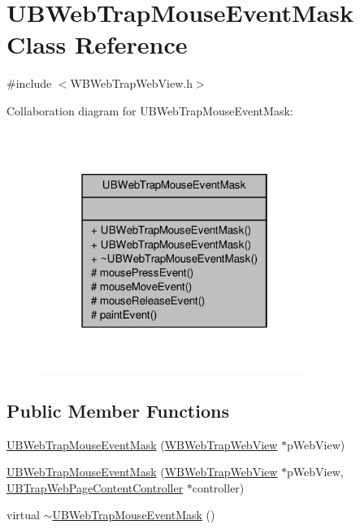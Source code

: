 \hypertarget{class_u_b_web_trap_mouse_event_mask}{\section{U\-B\-Web\-Trap\-Mouse\-Event\-Mask Class Reference}
\label{dd/df0/class_u_b_web_trap_mouse_event_mask}
}


{\ttfamily \#include $<$W\-B\-Web\-Trap\-Web\-View.\-h$>$}



Collaboration diagram for U\-B\-Web\-Trap\-Mouse\-Event\-Mask\-:
\nopagebreak
\begin{figure}[H]
\begin{center}
\leavevmode
\includegraphics[width=250pt]{d2/d54/class_u_b_web_trap_mouse_event_mask__coll__graph}
\end{center}
\end{figure}
\subsection*{Public Member Functions}
\begin{DoxyCompactItemize}
\item 
\hyperlink{class_u_b_web_trap_mouse_event_mask_ac9119adb597aa36e77fec485f994cd16}{U\-B\-Web\-Trap\-Mouse\-Event\-Mask} (\hyperlink{class_w_b_web_trap_web_view}{W\-B\-Web\-Trap\-Web\-View} $\ast$p\-Web\-View)
\item 
\hyperlink{class_u_b_web_trap_mouse_event_mask_a94c4a233a5339731cb884c0cc948d44a}{U\-B\-Web\-Trap\-Mouse\-Event\-Mask} (\hyperlink{class_w_b_web_trap_web_view}{W\-B\-Web\-Trap\-Web\-View} $\ast$p\-Web\-View, \hyperlink{class_u_b_trap_web_page_content_controller}{U\-B\-Trap\-Web\-Page\-Content\-Controller} $\ast$controller)
\item 
virtual \hyperlink{class_u_b_web_trap_mouse_event_mask_a78a8cc6d17b7017a1a1fb68953da08dc}{$\sim$\-U\-B\-Web\-Trap\-Mouse\-Event\-Mask} ()
\end{DoxyCompactItemize}
